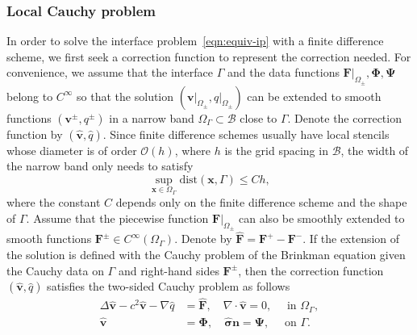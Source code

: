 \documentclass[preprint,11pt]{elsarticle}
\theoremstyle{remark}
\newcommand{\at}[2]{\left. #1 \right|_{#2}}
\newcommand{\grad}[1]{\nabla #1}
\newcommand{\mc}[1]{\mathcal{#1}}
\newcommand{\wh}[1]{\widehat{#1}}
\newcommand{\bm}[1]{\boldsymbol{#1}}
\begin{document}
\subsubsection{Local Cauchy problem}
In order to solve the interface problem~\eqref{eqn:equiv-ip} with a finite difference scheme, we first seek a correction function to represent the correction needed. 
For convenience, we assume that the interface $\Gamma$ and the data functions $\at{\bm F}{\Omega_\pm}, \bm \Phi, \bm \Psi$ belong to $C^{\infty}$ so that the solution $(\at{\bm v}{\Omega_\pm}, \at{q}{\Omega_\pm})$ can be extended to smooth functions $(\bm v^\pm, q^\pm)$ in a narrow band $\Omega_\Gamma\subset\mathcal{B}$ close to $\Gamma$. Denote the correction function by $(\wh{\bm v}, \wh q)$.
Since finite difference schemes usually have local stencils whose diameter is of order $\mc O(h)$, where $h$ is the grid spacing in $\mathcal{B}$, the width of the narrow band only needs to satisfy
\begin{equation}
    \sup_{\bm x\in\Omega_\Gamma}\text{dist}(\bm x, \Gamma) \leq C h,
\end{equation}
where the constant $C$ depends only on the finite difference scheme and the shape of $\Gamma$.
Assume that the piecewise function $\at{\bm F}{\Omega_\pm}$ can also be smoothly extended to smooth functions $\bm F^\pm\in C^\infty(\Omega_\Gamma)$. Denote by $\wh {\bm F} = \bm F^+ - \bm F^-$. 
If the extension of the solution is defined with the Cauchy problem of the Brinkman equation given the Cauchy data on $\Gamma$ and right-hand sides $\bm F^\pm$, then the correction function $(\wh{\bm v}, \wh q)$ satisfies the two-sided Cauchy problem as follows
\begin{subequations}\label{eqn:cau-pro}
\begin{align}
    \Delta  \wh{\bm v} - c^2 \wh{\bm v} - \grad \wh q &= \wh{\bm F}, \quad \grad \cdot \wh{\bm v} = 0,\quad \text{ in }\Omega_\Gamma, \\
    \wh{\bm v} &= \bm \Phi, \quad \wh{\bm \sigma} \bm n = \bm \Psi, \quad \text{ on }\Gamma.
\end{align}    
\end{subequations}
\end{document}
